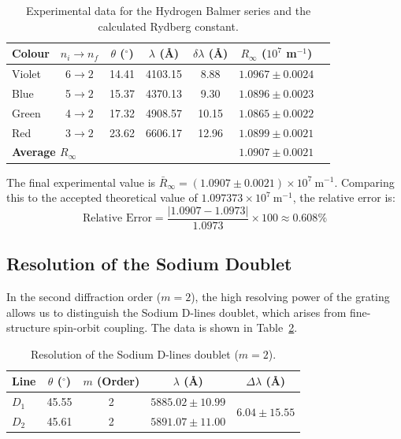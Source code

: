 \documentclass[a4paper,11pt]{article}
\begin{document}
\begin{table}[H]
\centering
\caption{Experimental data for the Hydrogen Balmer series and the calculated Rydberg constant.}
\label{tab:hydrogen}
\begin{tabular}{lcccccc}
\toprule
Colour & $n_i \to n_f$ & $\theta$ ($^\circ$) & $\lambda$ (\AA) & $\delta\lambda$ (\AA) & $R_\infty$ ($10^7$ m$^{-1}$) \\
\midrule
Violet & 6$\to 2$ & 14.41 & 4103.15 & 8.88 & $1.0967 \pm 0.0024$ \\
Blue & 5$\to 2$ & 15.37 & 4370.13 & 9.30 & $1.0896 \pm 0.0023$ \\
Green & 4$\to 2$ & 17.32 & 4908.57 & 10.15 & $1.0865 \pm 0.0022$ \\
Red & 3$\to 2$ & 23.62 & 6606.17 & 12.96 & $1.0899 \pm 0.0021$ \\
\midrule
\multicolumn{5}{l}{\textbf{Average $R_\infty$}} & $\mathbf{1.0907 \pm 0.0021}$ \\
\bottomrule
\end{tabular}
\end{table}

The final experimental value is $\bar{R}_\infty = (1.0907 \pm 0.0021) \times 10^7\ \text{m}^{-1}$. Comparing this to the accepted theoretical value of $1.097373 \times 10^7\ \text{m}^{-1}$, the relative error is:
\begin{equation}
    \text{Relative Error} = \frac{|1.0907 - 1.0973|}{1.0973} \times 100 \approx 0.608\%
\end{equation}

\subsection{Resolution of the Sodium Doublet}
In the second diffraction order ($m=2$), the high resolving power of the grating allows us to distinguish the Sodium D-lines doublet, which arises from fine-structure spin-orbit coupling. The data is shown in Table~\ref{tab:doublet}.

\begin{table}[H]
\centering
\caption{Resolution of the Sodium D-lines doublet ($m=2$).}
\label{tab:doublet}
\begin{tabular}{lcccc}
\toprule
Line & $\theta$ ($^\circ$) & $m$ (Order) & $\lambda$ (\AA) & $\Delta\lambda$ (\AA) \\
\midrule
$D_1$ & 45.55 & 2 & $5885.02 \pm 10.99$ & \multirow{2}{*}{$6.04 \pm 15.55$} \\
$D_2$ & 45.61 & 2 & $5891.07 \pm 11.00$ & \\
\bottomrule
\end{tabular}
\end{table}
\end{document}
